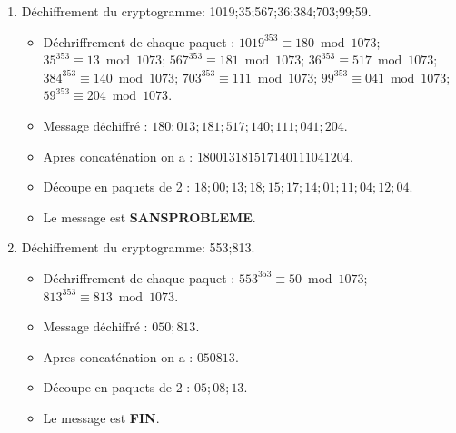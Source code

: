 \documentclass{homework}
\begin{document}
\begin{enumerate}
\begin{enumerate}
					\item Déchiffrement du cryptogramme: 1019;35;567;36;384;703;99;59.
						\begin{itemize}
							\item Déchriffrement de chaque paquet : $1019^{353} \equiv 180 \bmod 1073$; $35^{353} \equiv 13 \bmod 1073$; $567^{353} \equiv 181 \bmod 1073$; $36^{353} \equiv 517 \bmod 1073$; $384^{353} \equiv 140 \bmod 1073$; $703^{353} \equiv 111 \bmod 1073$; $99^{353} \equiv 041 \bmod 1073$; $59^{353} \equiv 204 \bmod 1073$.
							\item Message déchiffré : $180;013;181;517;140;111;041;204$.
							\item Apres concaténation on a : $180013181517140111041204$.
							\item Découpe en paquets de 2 : $18;00;13;18;15;17;14;01;11;04;12;04$.
							\item Le message est \textbf{SANSPROBLEME}.
						\end{itemize}
						
					\item Déchiffrement du cryptogramme: 553;813.
						\begin{itemize}
							\item Déchriffrement de chaque paquet : $553^{353} \equiv 50 \bmod 1073$; $813^{353} \equiv 813 \bmod 1073$.
							\item Message déchiffré : $050;813$.
							\item Apres concaténation on a : $050813$.
							\item Découpe en paquets de 2 : $05;08;13$.
							\item Le message est \textbf{FIN}.
						\end{itemize}
						
				\end{enumerate}
		\end{enumerate}
\end{document}
